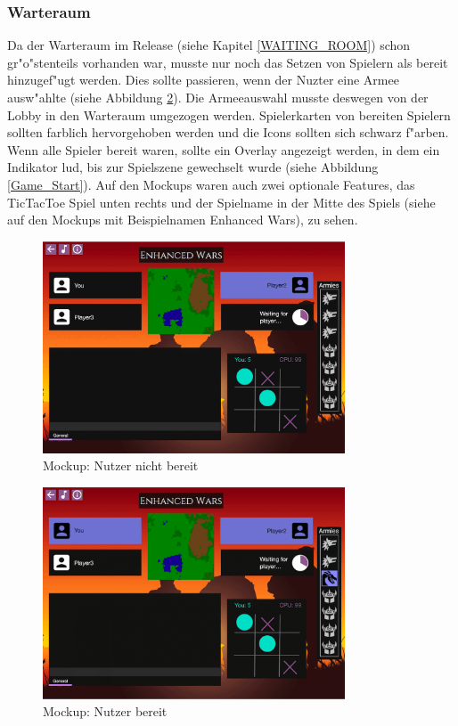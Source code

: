 \documentclass[12pt, titlepage]{scrartcl}
\newcommand{\RN}[1]{%
	\textup{\uppercase\expandafter{\romannumeral#1}}%
}
\begin{document}
		    \subsubsection{Warteraum}
		        Da der Warteraum im Release \RN{2} (siehe Kapitel \ref{WAITING_ROOM}) schon gr"o"stenteils vorhanden war, musste nur noch das Setzen von Spielern als bereit hinzugef"ugt werden. Dies sollte passieren, wenn der Nuzter eine Armee ausw"ahlte (siehe Abbildung \ref{Ready}). Die Armeeauswahl musste deswegen von der Lobby in den Warteraum umgezogen werden. Spielerkarten von bereiten Spielern sollten farblich hervorgehoben werden und die Icons sollten sich schwarz f"arben. Wenn alle Spieler bereit waren, sollte ein Overlay angezeigt werden, in dem ein Indikator lud, bis zur Spielszene gewechselt wurde (siehe Abbildung \ref{Game_Start}). Auf den Mockups waren auch zwei optionale Features, das TicTacToe Spiel unten rechts und der Spielname in der Mitte des Spiels (siehe auf den Mockups mit Beispielnamen \glqq Enhanced Wars\grqq), zu sehen. \\
		        \begin{figure}[H] 
    				\centering
    				\includegraphics[width=0.8\textwidth]{images/mockups/NotReady.png}
    				\caption{Mockup: Nutzer nicht bereit}
    				\label{Not_Ready}
			    \end{figure}
			    \begin{figure}[H] 
    				\centering
    				\includegraphics[width=0.8\textwidth]{images/mockups/Ready.png}
    				\caption{Mockup: Nutzer bereit}
    				\label{Ready}
			    \end{figure}
\end{document}

